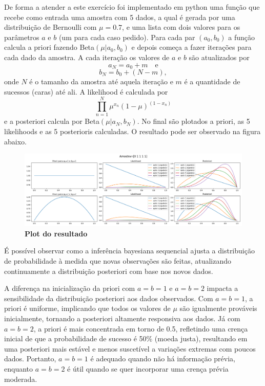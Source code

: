 \begin{enumerate}[label=E\arabic*]
De forma a atender a este exercício foi implementado em python uma função que recebe como entrada uma amostra com 5 dados, a qual é gerada por uma distribuição de Bernoulli com $\mu=0.7$, e uma lista com dois valores para os parâmetros $a$ e $b$ (um para cada caso pedido). Para cada par $(a_0,b_0)$ a função calcula a priori fazendo Beta$(\mu|a_0,b_0)$ e depois começa a fazer iterações para cada dado da amostra. A cada iteração os valores de $a$ e $b$ são atualizados por 
\begin{equation*}
    a_N = a_0 + m \quad \text{e}
\end{equation*}
\begin{equation*}
    b_N = b_0 + (N - m),
\end{equation*}
onde $N$ é o tamanho da amostra até aquela iteração e $m$ é a quantidade de sucessos (caras) até ali. A likelihood é calculada por 
\begin{equation*}
    \prod_{n=1}^{N}\mu^{x_n}(1-\mu)^{(1-x_n)}
\end{equation*}
e a posteriori calcula por Beta$(\mu|a_N,b_N)$. No final são plotados a priori, as 5 likelihoods e as 5 posterioris calculadas. O resultado pode ser observado na figura abaixo.

\begin{figure}[H]
    \caption{\textbf{Plot do resultado}}
       \centering
       \includegraphics[width=\textwidth]{ex1.png}
\end{figure}

É possível observar como a inferência bayesiana sequencial ajusta a distribuição de probabilidade à medida que novas observações são feitas, atualizando continuamente a distribuição posteriori com base nos novos dados.

A diferença na inicialização da priori com $a = b = 1$ e $a = b = 2$ impacta a sensibilidade da distribuição posteriori aos dados observados. Com $a = b = 1$, a priori é uniforme, implicando que todos os valores de $\mu$ são igualmente prováveis inicialmente, tornando a posteriori altamente responsiva aos dados. Já com $a = b = 2$, a priori é mais concentrada em torno de 0.5, refletindo uma crença inicial de que a probabilidade de sucesso é 50\% (moeda justa), resultando em uma posteriori mais estável e menos suscetível a variações extremas com poucos dados. Portanto, $a = b = 1$ é adequado quando não há informação prévia, enquanto $a = b = 2$ é útil quando se quer incorporar uma crença prévia moderada.



\end{enumerate}
